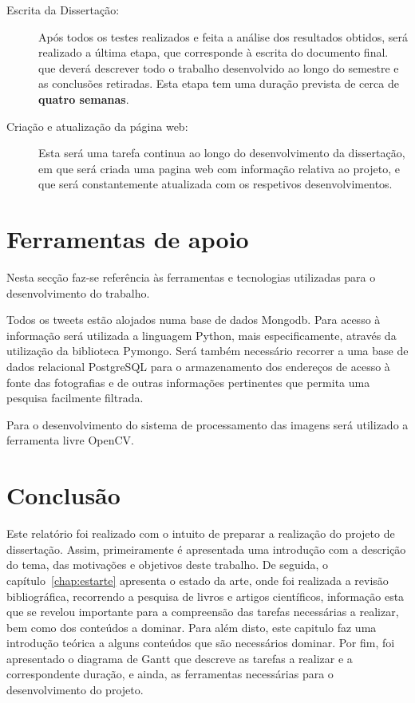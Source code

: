 \begin{description}
\item[Escrita da Dissertação: ] Após todos os testes realizados e feita a análise dos resultados obtidos, será realizado a última etapa, que corresponde à escrita do documento final. que deverá descrever todo o trabalho desenvolvido ao longo do semestre e as conclusões retiradas. Esta etapa tem uma duração prevista de cerca de \textbf{quatro semanas}.

\item[Criação e atualização da página web: ] Esta será uma tarefa continua ao longo do desenvolvimento da dissertação, em que será criada uma pagina web com informação relativa ao projeto, e que será constantemente atualizada com os respetivos desenvolvimentos.
\end{description}


\section{Ferramentas de apoio}

Nesta secção faz-se referência às ferramentas e tecnologias utilizadas para o desenvolvimento do trabalho.

Todos os tweets estão alojados numa base de dados Mongodb. Para acesso à informação será utilizada a linguagem Python, mais especificamente, através da utilização da biblioteca Pymongo. Será também necessário recorrer a uma base de dados relacional PostgreSQL para o armazenamento dos endereços de acesso à fonte das fotografias e de outras informações pertinentes que permita uma pesquisa facilmente filtrada. 


Para o desenvolvimento do sistema de processamento das imagens será utilizado a ferramenta livre OpenCV.


\section{Conclusão}

Este relatório foi realizado com o intuito de preparar a realização do projeto de dissertação. Assim, primeiramente é apresentada uma introdução com a descrição do tema, das motivações e objetivos deste trabalho. De seguida, o capítulo~\ref{chap:estarte} apresenta o estado da arte, onde foi realizada a revisão bibliográfica, recorrendo a pesquisa de livros e artigos científicos, informação esta que se revelou importante para a compreensão das tarefas necessárias a realizar, bem como dos conteúdos a dominar. Para além disto, este capitulo faz uma introdução teórica a alguns conteúdos que são necessários dominar. Por fim, foi apresentado o diagrama de Gantt que descreve as tarefas a realizar e a correspondente duração, e ainda, as ferramentas necessárias para o desenvolvimento do projeto.


